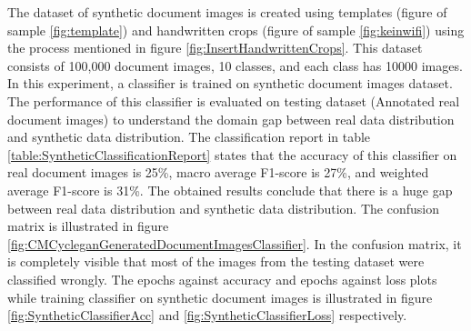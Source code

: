 The dataset of synthetic document images is created using templates (figure of sample \ref{fig:template}) and handwritten crops (figure of sample \ref{fig:keinwifi}) using the process mentioned in figure \ref{fig:InsertHandwrittenCrops}. This dataset consists of 100,000 document images, 10 classes, and each class has 10000 images. In this experiment, a classifier is trained on synthetic document images dataset. The performance of this classifier is evaluated on testing dataset (Annotated real document images) to understand the domain gap between real data distribution and synthetic data distribution. The classification report in table \ref{table:SyntheticClassificationReport} states that the accuracy of this classifier on real document images is 25\%, macro average F1-score is 27\%, and weighted average F1-score is 31\%. The obtained results conclude that there is a huge gap between real data distribution and synthetic data distribution. The confusion matrix is illustrated in figure \ref{fig:CMCycleganGeneratedDocumentImagesClassifier}. In the confusion matrix, it is completely visible that most of the images from the testing dataset were classified wrongly. The epochs against accuracy and epochs against loss plots while training classifier on synthetic document images is illustrated in figure \ref{fig:SyntheticClassifierAcc} and \ref{fig:SyntheticClassifierLoss} respectively.



